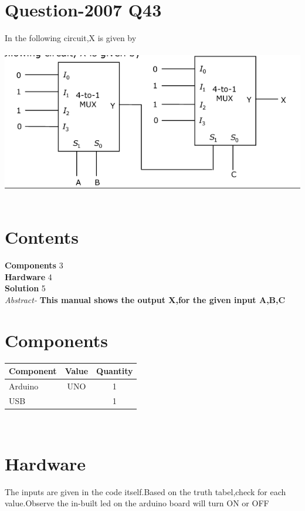 \documentclass[10pt]{report}
\begin{document}
\begin{multicols}{2} 
\section{Question-2007  Q43}
In the following circuit,X is given by \\
\
\includegraphics[scale=0.40]{mux.png}\\
\
\section{Contents}
\raggedright
\textbf{Components}\hspace{4.35cm} 3
\\\textbf{Hardware}\hspace{4.78cm}   4
\\\textbf{Solution}
\hspace{4.95cm}   5\\
\vspace{1cm}
\textit{Abstract-}
\textbf{This manual shows the output X,for the given input A,B,C}
\section{Components}
\centering
\begin{tabular}{|l|c|c|}
\hline
Component & Value & Quantity\\
\hline
Arduino & UNO & 1\\
\hline
USB & & 1\\
\hline
\end{tabular}\\
\section{Hardware}
\raggedright The inputs are given in the code itself.Based on the truth tabel,check for each value.Observe the in-built led on the arduino board will turn ON or OFF \\
\centering

\end{multicols}
\end{document}
